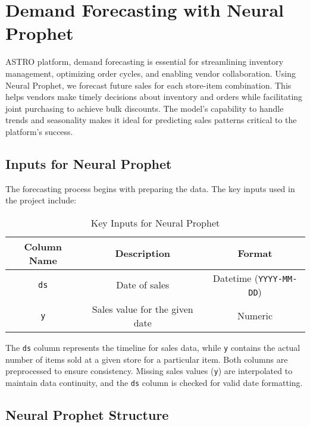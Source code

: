 \section{Demand Forecasting with Neural Prophet}

ASTRO platform, demand forecasting\cite{gardner1980forecasting} is essential for streamlining inventory management, optimizing order cycles, and enabling vendor collaboration. Using Neural Prophet\cite{triebe2021neuralprophet}, we forecast future sales for each store-item combination. This helps vendors make timely decisions about inventory and orders while facilitating joint purchasing to achieve bulk discounts. The model’s capability to handle trends and seasonality makes it ideal for predicting sales patterns critical to the platform’s success.

\subsection{Inputs for Neural Prophet}

The forecasting process begins with preparing the data. The key inputs used in the project include:

\begin{table}[h!]
    \centering
    \begin{tabular}{|c|c|c|}
        \hline
        \textbf{Column Name} & \textbf{Description}           & \textbf{Format}                \\
        \hline
        \texttt{ds}          & Date of sales                  & Datetime (\texttt{YYYY-MM-DD}) \\
        \hline
        \texttt{y}           & Sales value for the given date & Numeric                        \\
        \hline
    \end{tabular}
    \caption{Key Inputs for Neural Prophet}
\end{table}

The \texttt{ds} column represents the timeline for sales data, while \texttt{y} contains the actual number of items sold at a given store for a particular item. Both columns are preprocessed to ensure consistency. Missing sales values (\texttt{y}) are interpolated to maintain data continuity, and the \texttt{ds} column is checked for valid date formatting.

\subsection{Neural Prophet Structure}

